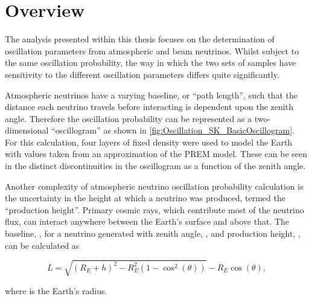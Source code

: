 \section{Overview}
\label{sec:Oscillation_Overview}

The analysis presented within this thesis focuses on the determination of oscillation parameters from atmospheric and beam neutrinos. Whilst subject to the same oscillation probability, the way in which the two sets of samples have sensitivity to the different oscillation parameters differs quite significantly.

Atmospheric neutrinos have a varying baseline, or ``path length'', such that the distance each neutrino travels before interacting is dependent upon the zenith angle. Therefore the oscillation probability can be represented as a two-dimensional ``oscillogram'' as shown in \autoref{fig:Oscillation_SK_BasicOscillogram}. For this calculation, four layers of fixed density were used to model the Earth with values taken from an approximation of the PREM model. These can be seen in the distinct discontinuities in the oscillogram as a function of the zenith angle.

Another complexity of atmospheric neutrino oscillation probability calculation is the uncertainty in the height at which a neutrino was produced, termed the ``production height''. Primary cosmic rays, which contribute most of the neutrino flux, can interact anywhere between the Earth's surface and  above that. The baseline, , for a neutrino generated with zenith angle, \quickmath{\theta}, and production height, , can be calculated as

\begin{equation}
  L = \sqrt{\left(R_{E} + h\right)^{2} - R_{E}^{2} \left(1 - \cos^{2} \left(\theta \right) \right)} - R_{E}\cos(\theta),
\end{equation}

where  is the Earth's radius.

